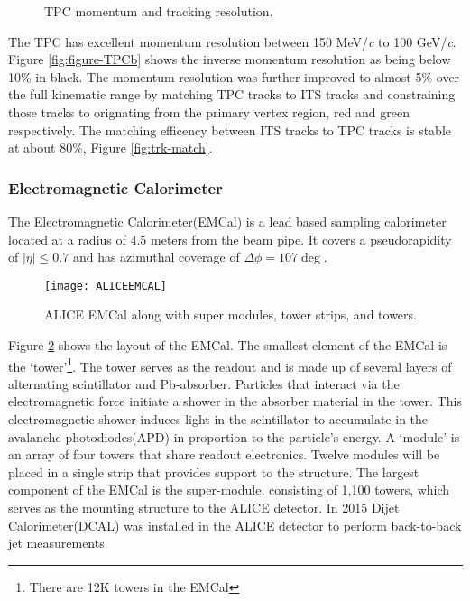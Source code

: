 \begin{figure}[h]
   \centering
   \caption{TPC momentum and tracking resolution\cite{Abelev:2014ffa}.}
   \label{fig:multipart-TPC}
\end{figure}

\noindent
The TPC has excellent momentum resolution between 150 MeV/\textit{c} to 100 GeV/\textit{c}\cite{LIPPMANN2012434}.  Figure \ref{fig:figure-TPCb} shows the inverse momentum resolution as being below 10\% in black.  The momentum resolution was further improved to almost 5\% over the full kinematic range by matching TPC tracks to ITS tracks and constraining those tracks to orignating from the primary vertex region, red and green respectively.  The matching efficency between ITS tracks to TPC tracks is stable at about 80\%, Figure \ref{fig:trk-match}.




\subsubsection{Electromagnetic Calorimeter}
The Electromagnetic Calorimeter(EMCal)\cite{1742-6596-293-1-012043} is a lead based sampling calorimeter located at a radius of 4.5 meters from the beam pipe.  It covers a pseudorapidity of $ \left | \eta \right | \leq 0.7$ and has azimuthal coverage of $ \Delta \phi = 107 \deg$.

\begin{figure}[h]
\texttt{[image: ALICEEMCAL]}
\centering
\caption{ALICE EMCal along with super modules, tower strips, and towers\cite{1742-6596-110-3-032006}.}
\label{fig:EMCal}
\end{figure}

\noindent
Figure \ref{fig:EMCal} shows the layout of the EMCal.  The smallest element of the EMCal is the `tower'\footnote{There are 12K towers in the EMCal}.  The tower serves as the readout and is made up of several layers of alternating scintillator and Pb-absorber.  Particles that interact via the electromagnetic force initiate a shower in the absorber material in the tower.  This electromagnetic shower induces light in the scintillator  to accumulate in the avalanche photodiodes(APD) in proportion to the particle's energy.  A `module' is an array of four towers that share readout electronics.  Twelve modules will be placed in a single strip that provides support to the structure.  The largest component of the EMCal is the super-module, consisting of 1,100 towers,  which serves as the mounting structure to the ALICE detector.  In 2015 Dijet Calorimeter(DCAL) was installed in the ALICE detector to perform back-to-back jet measurements.


